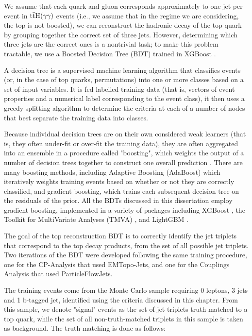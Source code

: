 We assume that each quark and gluon corresponds approximately to one jet per event in $\mathrm{t\bar{t}H}(\gamma \gamma)$ events (i.e., we assume that in the regime we are considering, the top is not boosted), we can reconstruct the hadronic decay of the top quark by grouping together the correct set of three jets. However, determining which three jets are the correct ones is a nontrivial task; to make this problem tractable, we use a Boosted Decision Tree (BDT) trained in XGBoost \cite{XGBoost}.

A decision tree is a supervised machine learning algorithm that classifies events (or, in the case of top quarks, permutations) into one or more classes based on a set of input variables. It is fed labelled training data (that is, vectors of event properties and a numerical label corresponding to the event class), it then uses a greedy splitting algorithm to determine the criteria at each of a number of nodes that best separate the training data into classes.

Because individual decision trees are on their own considered weak learners (that is, they often under-fit or over-fit the training data), they are often aggregated into an ensemble in a procedure called "boosting", which weights the output of a number of decision trees together to construct one overall prediction \cite{BDTs}. There are many boosting methods, including Adaptive Boosting (AdaBoost) \cite{ADABoost}which iteratively weights training events based on whether or not they are correctly classified, and gradient boosting, which trains each subsequent decision tree on the residuals of the prior. All the BDTs discussed in this dissertation employ gradient boosting, implemented in a variety of packages including XGBoost \cite{BDTs}, the Toolkit for MultiVariate Analyses (TMVA) \cite{TMVA}, and LightGBM \cite{LightGBM}.

The goal of the top reconstruction BDT is to correctly identify the jet triplets that correspond to the top decay products, from the set of all possible jet triplets. Two iterations of the BDT were developed following the same training procedure, one for the CP-Analysis that used EMTopo-Jets, and one for the Couplings Analysis that used ParticleFlowJets.

The training events come from the \ttH Monte Carlo sample requiring 0 leptons, 3 jets and 1 b-tagged jet, identified using the criteria discussed in this chapter. From this sample, we denote "signal" events as the set of jet triplets truth-matched to a top quark, while the set of all non-truth-matched triplets in this sample is taken as background. The truth matching is done as follows:

